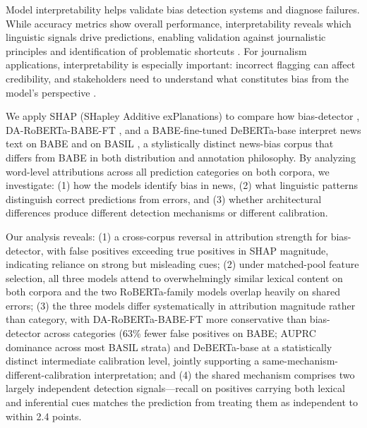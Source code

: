 \documentclass[11pt]{article}
\begin{document}

Model interpretability helps validate bias detection systems and 
diagnose failures. While accuracy metrics show overall performance, 
interpretability reveals which linguistic signals drive predictions, 
enabling validation against journalistic principles and identification 
of problematic shortcuts 
\cite{lipton2017mythosmodelinterpretability, doshivelez2017rigorousscienceinterpretablemachine}. 
For journalism applications, interpretability is especially 
important: incorrect flagging can affect credibility, and stakeholders 
need to understand what constitutes bias from the model's perspective 
\cite{rudin2019stopexplainingblackbox}.

We apply SHAP (SHapley Additive exPlanations) to compare how 
bias-detector \cite{ghosh2025}, DA-RoBERTa-BABE-FT 
\cite{Krieger2022}, and a BABE-fine-tuned DeBERTa-base 
\cite{he2021deberta} interpret news text on BABE 
\cite{spinde2021babe} and on BASIL \cite{fan-etal-2019-plain}, a 
stylistically distinct news-bias corpus that differs from BABE in 
both distribution and annotation philosophy. By analyzing word-level attributions across 
all prediction categories on both corpora, we investigate: (1) how 
the models identify bias in news, (2) what linguistic patterns 
distinguish correct predictions from errors, and (3) whether 
architectural differences produce different detection mechanisms or 
different calibration.

Our analysis reveals: (1) a cross-corpus reversal in attribution 
strength for bias-detector, with false positives exceeding true 
positives in SHAP magnitude, indicating reliance on strong but 
misleading cues; (2) under matched-pool feature selection, all three 
models attend to overwhelmingly similar lexical content on both 
corpora and the two RoBERTa-family models overlap heavily on shared 
errors; (3) the three models differ systematically in attribution 
magnitude rather than category, with DA-RoBERTa-BABE-FT more 
conservative than bias-detector across categories (63\% fewer false 
positives on BABE; AUPRC dominance across most BASIL strata) and 
DeBERTa-base at a statistically distinct intermediate calibration 
level, jointly supporting a same-mechanism-different-calibration 
interpretation; and (4) the shared mechanism comprises two largely 
independent detection signals---recall on positives carrying both 
lexical and inferential cues matches the prediction from treating 
them as independent to within 2.4 points.
\end{document}
